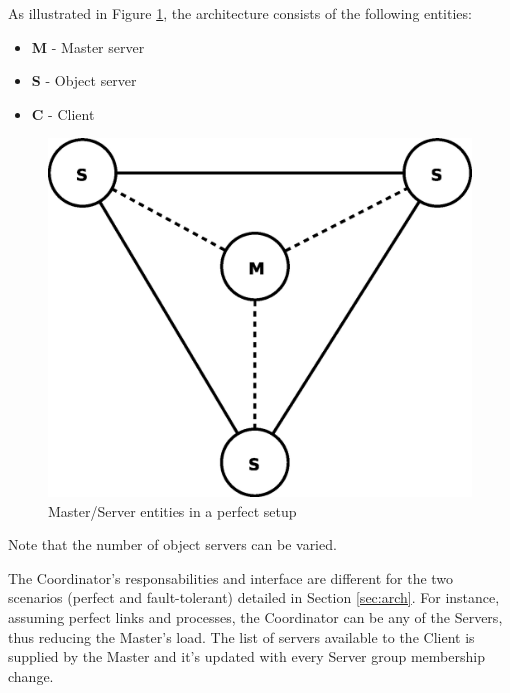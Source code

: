 \documentclass[times, 10pt,twocolumn]{article}
\begin{document}
\label{subsec:perf}
As illustrated in Figure \ref{fig:perf}, the architecture consists of the 
following entities: 
\begin{itemize}[noitemsep,nolistsep]
\item {\bf M} - Master server 
\item {\bf S} - Object server
\item {\bf C} - Client      
\end{itemize}

\begin{figure}
\centering
\includegraphics[scale=0.3]{perfect.eps}
\caption{Master/Server entities in a perfect setup}
\label{fig:perf}
\end{figure}
Note that the number of object servers can be varied.
\label{subsec:recov}

\label{subsec:respon}

The Coordinator's responsabilities and interface are different for the two scenarios (perfect and fault-tolerant) detailed in Section \ref{sec:arch}. For instance, assuming perfect links and processes, the Coordinator can be any of the Servers, thus reducing the Master's load. The list of servers available to the Client is supplied by the Master and it's updated with every Server group membership change.
\end{document}
